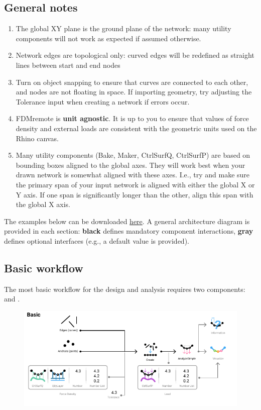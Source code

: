 \subsection{General notes}
\begin{enumerate}
    \item The global XY plane is the ground plane of the network: many utility components will not work as expected if assumed otherwise.
    \item Network edges are topological only: curved edges will be redefined as straight lines between start and end nodes
    \item Turn on object snapping to ensure that curves are connected to each other, and nodes are not floating in space. If importing geometry, try adjusting the Tolerance input when creating a network if errors occur.
    \item FDMremote is \textbf{unit agnostic}. It is up to you to ensure that values of force density and external loads are consistent with the geometric units used on the Rhino canvas.
    \item Many utility components (Bake, Maker, CtrlSurfQ, CtrlSurfP) are based on bounding boxes aligned to the global axes. They will work best when your drawn network is somewhat aligned with these axes. I.e., try and make sure the primary span of your input network is aligned with either the global X or Y axis. If one span is significantly longer than the other, align this span with the global X axis.
\end{enumerate}

The examples below can be downloaded \href{https://www.food4rhino.com/en/app/fdmremote?lang=en}{here}. A general architecture diagram is provided in each section: \textbf{black} defines mandatory component interactions, {\color{gray} \textbf{gray}} defines optional interfaces (e.g., a default value is provided).

\newpage
\subsection{Basic workflow}
The most basic workflow for the design and analysis requires two components:  and .

\begin{figure}[h]
    \centering
    \includegraphics*[width=\textwidth]{Figures/basic}
\end{figure}

